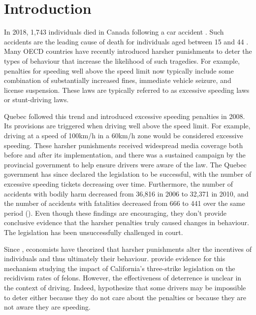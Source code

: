 \section{Introduction}
\label{sec:Introduction}

In 2018, 1,743 individuals died in Canada following a car accident 
\citep{transcan2018}. 
Such accidents are the leading cause of death for individuals aged between 15 and 44
\citep{statscan2020}.   
Many OECD countries have recently introduced harsher punishments to deter 
the types of behaviour that increase the likelihood of such tragedies. 
For example, penalties for speeding well above the speed limit now typically include 
some combination of substantially increased fines, immediate vehicle seizure, and license suspension.
These laws are typically referred to as excessive speeding laws or stunt-driving laws. 

Quebec followed this trend and introduced excessive speeding penalties in 2008. 
Its provisions are triggered when driving well above the speed limit. 
For example, driving at a speed of 100km/h in a 60km/h zone would be considered excessive speeding.
These harsher punishments received widespread media coverage 
both before and after its implementation, 
and there was a sustained campaign by the provincial government 
to help ensure drivers were aware of the law. 
The Quebec government has since declared the legislation to be successful, 
with the number of excessive speeding tickets decreasing over time. 
Furthermore, the number of accidents with bodily harm 
decreased from 36,816 in 2006 to 32,371 in 2010, 
and the number of accidents with fatalities decreased from 666 to 441 
over the same period 
(\citet{saaq2011}). 
Even though these findings are encouraging, 
they don’t provide conclusive evidence that the harsher penalties truly caused changes in behaviour. 
The legislation has been unsuccessfully challenged in court.

Since 
\citet{becker1968b}, 
economists have theorized that harsher punishments 
alter the incentives of individuals and thus ultimately their behaviour. 
\citet{hellandtabarrok2007} 
provide evidence for this mechanism 
studying the impact of California’s three-strike legislation on the recidivism rates of felons. 
However, the effectiveness of deterrence is unclear in the context of driving. 
Indeed, 
\citet{bourgeonpicard2007} 
hypothesize that some drivers may be impossible to deter 
either because they do not care about the penalties or because they are not aware they are speeding.

